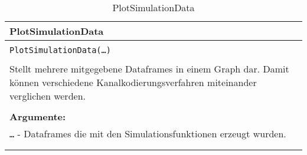 \begin{longtable}{|p{\textwidth}|}
\hline
\rowcolor{lightblue}
PlotSimulationData\\
\hline
\\
\texttt{PlotSimulationData(\dots)}\\
\\
Stellt mehrere mitgegebene Dataframes in einem Graph dar. Damit können verschiedene Kanalkodierungsverfahren miteinander verglichen werden.\\
\\
\textbf{Argumente:}\\
\texttt{\dots} - Dataframes die mit den Simulationsfunktionen erzeugt wurden.\\	
\\
\hline
\caption{PlotSimulationData}
\label{func:plot}
\end{longtable}